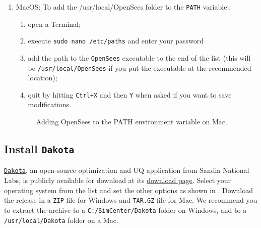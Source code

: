 \begin{enumerate}
\item MacOS: To add the /usr/local/OpenSees folder to the \texttt{PATH} variable::


\begin{enumerate}
    \item open a Terminal;
    \item execute \texttt{sudo nano /etc/paths} and enter your password
    \item add the path to the \texttt{OpenSees} executable to the end of the list (this will be \texttt{/usr/local/OpenSees} if you put the executable at the recommended location);
    \item quit by hitting \texttt{Ctrl+X} and then \texttt{Y} when asked if you want to save modifications.
\end{enumerate}

\begin{figure}[!htbp]
  \caption{Adding OpenSees to the PATH environment variable on Mac.}
  \label{fig:add_env_path_Mac}
\end{figure}
\end{enumerate}


\subsection{Install \texttt{Dakota}}

\href{http://dakota.sandia.gov}{\texttt{Dakota}}, an open-source  optimization and UQ application from Sandia National Labs, is publicly available for download at its \href{http://dakota.sandia.gov/download.html}{download page}. Select your operating system from the list and set the other options as shown in  . Download the release in a \texttt{ZIP} file for Windows and \texttt{TAR.GZ} file for Mac. We recommend you to extract the archive to a \texttt{C:/SimCenter/Dakota} folder on Windows, and to a \texttt{/usr/local/Dakota} folder on a Mac.


